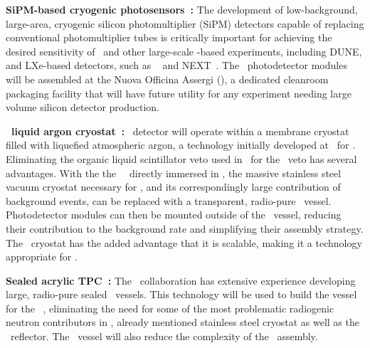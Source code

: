 {\bf SiPM-based cryogenic photosensors~\cite{Aalseth:2018gq,DIncecco:2018hy,DIncecco:2018fx}:}
The development of low-background, large-area, cryogenic silicon photomultiplier (SiPM) detectors capable of replacing conventional photomultiplier tubes is critically important for achieving the desired sensitivity of \DSks\ and other large-scale \LAr-based experiments, including DUNE, and LXe-based detectors, such as \nEXO~\cite{Ostrovskiy:2015jl} and NEXT~\cite{Cebrian:2017dy,GomezCadenas:2016cm,Cebrian:2015du}.  The \DSks\ photodetector modules will be assembled at the Nuova Officina Assergi (\NOA), a dedicated cleanroom packaging facility that will have future utility for any experiment needing large volume silicon detector production.


{\bf \pDUNE\ liquid argon cryostat~\cite{Abi:2017wp,Acciarri:2016wz}:}
\DSks\ detector will operate within a membrane cryostat filled with liquefied atmospheric argon, a technology initially developed at \CERN\ for \pDUNE. Eliminating the organic liquid scintillator veto used in \DSfs\ for the \AAr\ veto has several advantages. With the the \DSks\ \LArTPC\ directly immersed in \AAr, the massive stainless steel vacuum cryostat necessary for \DSfs, and its correspondingly large contribution of background events, can be replaced with a transparent, radio-pure \PMMA\ vessel. Photodetector modules can then be mounted outside of the \PMMA\ vessel, reducing their contribution to the background rate and simplifying their assembly strategy. The \pDUNE\ cryostat has the added advantage that it is scalable, making it a technology appropriate for \Argo.

{\bf Sealed acrylic TPC~\cite{Boulay:2012er,Nantais:2013jp,Amaudruz:2018gr}:}
The \DEAP\ collaboration has extensive experience developing large, radio-pure sealed \PMMA\ vessels. This technology will be used to build the vessel for the \DSks\ \LArTPC, eliminating the need for some of the most problematic radiogenic neutron contributors in \DSfs, already mentioned stainless steel cryostat as well as the \PTFE\ reflector. The \PMMA\ vessel will also reduce the complexity of the \TPC\ assembly.

